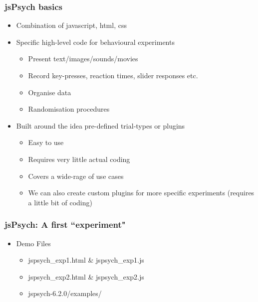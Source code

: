 \documentclass[t]{beamer}
\begin{document}
\begin{frame}[fragile]
    \frametitle{jsPsych basics}
    \begin{itemize}
        \item Combination of javascript, html, css
        \item Specific high-level code for behavioural experiments 
            \begin{itemize}
                \item Present text/images/sounds/movies
                \item Record key-presses, reaction times, slider responses etc.
                \item Organise data 
                \item Randomisation procedures
            \end{itemize}
        \item Built around the idea pre-defined trial-types or plugins
            \begin{itemize}
                \item Easy to use 
                \item Requires very little actual coding
                \item Covers a wide-rage of use cases 
                \item We can also create custom plugins for more specific experiments (requires a little bit of coding)
            \end{itemize}
    \end{itemize}
\end{frame}


\begin{frame}[fragile]
    \frametitle{jsPsych: A first ``experiment"}
    \begin{itemize}
        \item Demo Files
            \begin{itemize}
                \item jspsych\_exp1.html \& jspsych\_exp1.js
                \item jspsych\_exp2.html \& jspsych\_exp2.js
                \item jspsych-6.2.0/examples/
            \end{itemize}
    \end{itemize}
\end{frame}
\end{document}
